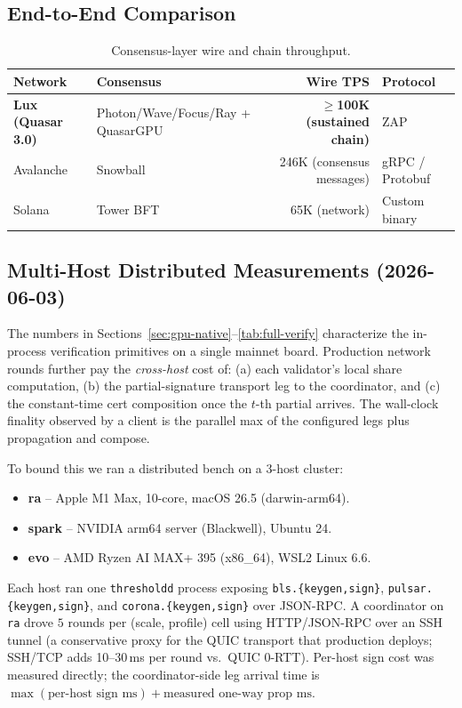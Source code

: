 \subsection{End-to-End Comparison}

\begin{table}[ht]
\centering
\small
\begin{tabular}{@{}llrl@{}}
\toprule
\textbf{Network} & \textbf{Consensus} & \textbf{Wire TPS} & \textbf{Protocol} \\
\midrule
\textbf{Lux (Quasar 3.0)} & Photon/Wave/Focus/Ray + QuasarGPU &
  \textbf{$\geq$100K (sustained chain)} & ZAP \\
Avalanche & Snowball & 246K (consensus messages) & gRPC / Protobuf \\
Solana    & Tower BFT & 65K (network) & Custom binary \\
\bottomrule
\end{tabular}
\caption{Consensus-layer wire and chain throughput.}
\label{tab:comparison}
\end{table}

\subsection{Multi-Host Distributed Measurements (2026-06-03)}
\label{sec:multi-host-dist}

The numbers in
Sections~\ref{sec:gpu-native}--\ref{tab:full-verify}
characterize the in-process verification primitives on a single
mainnet board. Production network rounds further pay the
\emph{cross-host} cost of: (a) each validator's local share
computation, (b) the partial-signature transport leg to the
coordinator, and (c) the constant-time cert composition once the
$t$-th partial arrives. The wall-clock finality observed by a
client is the parallel max of the configured legs plus
propagation and compose.

To bound this we ran a distributed bench on a 3-host cluster:

\begin{itemize}[leftmargin=2em,nosep]
\item \textbf{ra} -- Apple M1 Max, 10-core, macOS 26.5 (darwin-arm64).
\item \textbf{spark} -- NVIDIA arm64 server (Blackwell), Ubuntu 24.
\item \textbf{evo} -- AMD Ryzen AI MAX+ 395 (x86\_64), WSL2 Linux 6.6.
\end{itemize}

Each host ran one \texttt{thresholdd} process exposing
\texttt{bls.\{keygen,sign\}}, \texttt{pulsar.\{keygen,sign\}}, and
\texttt{corona.\{keygen,sign\}} over JSON-RPC. A coordinator on \texttt{ra}
drove $5$ rounds per (scale, profile) cell using HTTP/JSON-RPC over an
SSH tunnel (a conservative proxy for the QUIC transport that production
deploys; SSH/TCP adds 10--30\,ms per round vs.\ QUIC 0-RTT). Per-host
sign cost was measured directly; the coordinator-side leg arrival time is
$\max(\text{per-host sign ms}) + \text{measured one-way prop ms}$.

